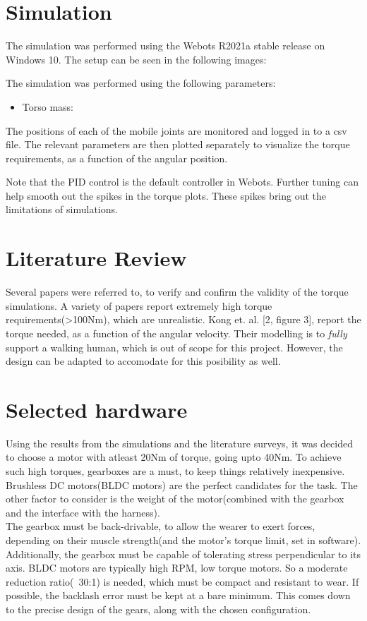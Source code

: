 \documentclass[a4paper]{article}
\begin{document}
	\section{Simulation}
		The simulation was performed using the Webots R2021a stable release on Windows 10. The setup can be seen in the following images:

		The simulation was performed using the following parameters:
		\begin{itemize}
			\item Torso mass:
		\end{itemize}

		The positions of each of the mobile joints are monitored and logged in to a csv file. The relevant parameters are then plotted separately to visualize the torque requirements, as a function of the angular position.


		Note that the PID control is the default controller in Webots. Further tuning can help smooth out the spikes in the torque plots. These spikes bring out the limitations of simulations.

	\section{Literature Review}
		Several papers were referred to, to verify and confirm the validity of the torque simulations. A variety of papers report extremely high torque requirements(>100Nm), which are unrealistic. Kong et. al. [2, figure 3], report the torque needed, as a function of the angular velocity. Their modelling is to \textit{fully} support a walking human, which is out of scope for this project. However, the design can be adapted to accomodate for this posibility as well.

	\section{Selected hardware}
		Using the results from the simulations and the literature surveys, it was decided to choose a motor with atleast 20Nm of torque, going upto 40Nm. To achieve such high torques, gearboxes are a must, to keep things relatively inexpensive. Brushless DC motors(BLDC motors) are the perfect candidates for the task. The other factor to consider is the weight of the motor(combined with the gearbox and the interface with the harness).\\

		The gearbox must be back-drivable, to allow the wearer to exert forces, depending on their muscle strength(and the motor's torque limit, set in software). Additionally, the gearbox must be capable of tolerating stress perpendicular to its axis. BLDC motors are typically high RPM, low torque motors. So a moderate reduction ratio(~30:1) is needed, which must be compact and resistant to wear. If possible, the backlash error must be kept at a bare minimum. This comes down to the precise design of the gears, along with the chosen configuration.\\
\end{document}
